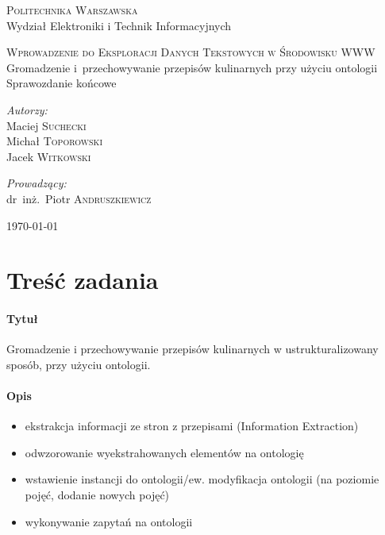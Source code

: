 \documentclass[11pt,a4paper]{article}
\begin{document}
\begin{titlepage}
  \begin{center}

    \textsc{\Large Politechnika Warszawska}\\[0.1cm]
    \small Wydział Elektroniki i Technik Informacyjnych
    \vfill

    \textsc{\small Wprowadzenie do Eksploracji Danych Tekstowych w Środowisku WWW }\\[0.1cm]
    \Huge Gromadzenie i~przechowywanie przepisów kulinarnych przy użyciu ontologii\\[1.5cm]
    \small Sprawozdanie końcowe\\[2.5cm]

    \vfill

    \begin{minipage}{0.4\textwidth}
      \begin{flushleft} \large
        \emph{Autorzy:}\\[0.1cm]
        Maciej \textsc{Suchecki}\\
        Michał \textsc{Toporowski}\\
        Jacek \textsc{Witkowski}\\
      \end{flushleft}
    \end{minipage}
    \begin{minipage}{0.4\textwidth}
      \begin{flushright} \large
        \emph{Prowadzący:}\\[0.1cm]
        dr~inż.~Piotr \textsc{Andruszkiewicz}\\[1cm]
      \end{flushright}
    \end{minipage}

    \vfill
    {\large \today}

  \end{center}
\end{titlepage}

\section{Treść zadania}
\paragraph{Tytuł} Gromadzenie i przechowywanie przepisów kulinarnych w ustrukturalizowany sposób, przy użyciu ontologii.
\paragraph{Opis}
\begin{itemize}
  \item ekstrakcja informacji ze stron z przepisami (Information Extraction)
  \item odwzorowanie wyekstrahowanych elementów na ontologię
  \item wstawienie instancji do ontologii/ew. modyfikacja ontologii (na poziomie pojęć, dodanie nowych pojęć)
  \item wykonywanie zapytań na ontologii
\end{itemize}
\end{document}
